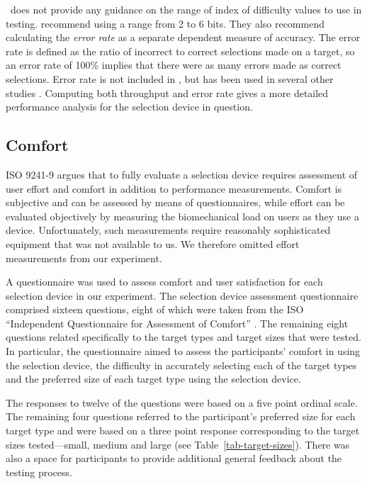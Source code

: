 \documentclass{elsart}
\begin{document}
\ISOnine\ does not provide any guidance on the range of index of
difficulty values to use in testing. \citet{Doug-SA-1999-CHI} recommend
using a range from 2 to 6 bits. They also recommend calculating the
\emph{error rate} as a separate dependent measure of accuracy. The
error rate is defined as the ratio of incorrect to correct selections
made on a target, so an error rate of 100\% implies that there were as
many errors made as correct selections. Error rate is not included in
\ISOnine, but has been used in several other studies
\citep{Sear-A-1991-IJMMS,Sear-A-1993-BIT,Hara-H-1996,Bend-G-1999-PhD,
Doug-SA-1999-CHI,Mack-IS-2001-EHCI,Po-BA-2004-CHI}. Computing both
throughput and error rate gives a more detailed performance analysis for
the selection device in question.


\subsection{Comfort}
\label{sec-evaluation-comfort}

ISO 9241-9 argues that to fully evaluate a selection device requires
assessment of user effort and comfort in addition to performance
measurements. Comfort is subjective and can be assessed by means of
questionnaires, while effort can be evaluated objectively by measuring
the biomechanical load on users as they use a device. Unfortunately,
such measurements require reasonably sophisticated equipment
\citep{Doug-SA-1999-CHI} that was not available to us. We therefore
omitted effort measurements from our experiment.

A questionnaire was used to assess comfort and user satisfaction for
each selection device in our experiment. The selection device assessment
questionnaire comprised sixteen questions, eight of which were taken
from the ISO ``Independent Questionnaire for Assessment of Comfort''
\citep{Doug-SA-1999-CHI}. The remaining eight questions related
specifically to the target types and target sizes that were tested. In
particular, the questionnaire aimed to assess the participants' comfort
in using the selection device, the difficulty in accurately selecting each
of the target types and the preferred size of each target type using the
selection device.

The responses to twelve of the questions were based on a five point
ordinal scale. The remaining four questions referred to the
participant's preferred size for each target type and were based on a
three point response corresponding to the target sizes tested---small,
medium and large (see Table~\ref{tab-target-sizes}). There was also a
space for participants to provide additional general feedback about the
testing process.
\end{document}
